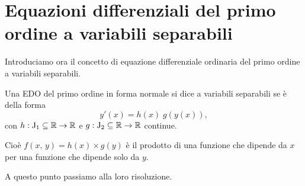 \documentclass[../../dimostrazioni]{subfiles}
\begin{document}
    \chapter{Equazioni differenziali del primo ordine a variabili separabili}

        Introduciamo ora il concetto di equazione differenziale ordinaria del primo ordine a variabili separabili.

        \begin{definizione}
            Una EDO del primo ordine in forma normale si dice a variabili separabili se è della forma
            \[
                y'(x) = h(x) \; g(y(x)),
            \]
            con \(h : \mathrm{J}_1 \subseteq \mathbb{R} \to \mathbb{R}\) e \(g : \mathrm{J}_2 \subseteq \mathbb{R} \to \mathbb{R}\) continue.

            Cioè \(f(x, \, y) = h(x) \times g(y)\) è il prodotto di una funzione che dipende da \(x\) per una funzione che dipende solo
            da \(y\).
        \end{definizione}

        A questo punto passiamo alla loro risoluzione.
\end{document}
